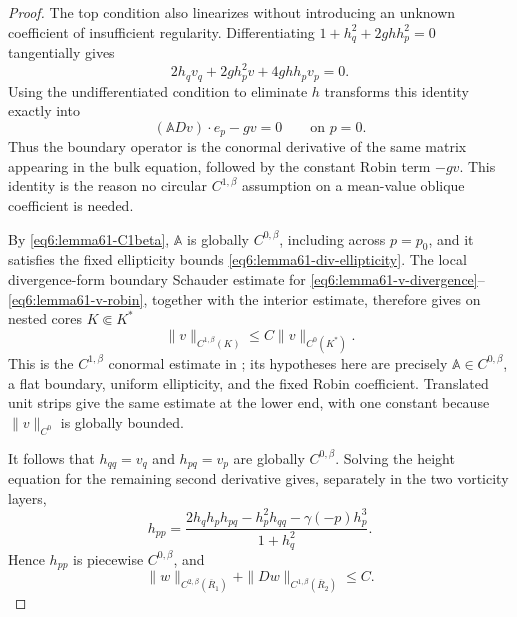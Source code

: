 \documentclass[11pt,reqno]{amsart}
\numberwithin{equation}{section}
\theoremstyle{definition}
\theoremstyle{remark}
\begin{document}
\begin{proof}
The top condition also linearizes without introducing an unknown
coefficient of insufficient regularity.  Differentiating
$1+h_q^2+2ghh_p^2=0$ tangentially gives
\[
 2h_qv_q+2gh_p^2v+4ghh_pv_p=0.
\]
Using the undifferentiated condition to eliminate $h$ transforms
this identity exactly into
\begin{equation}\label{eq6:lemma61-v-robin}
 (\mathbb A Dv)\mathbin{\cdot}e_p-gv=0
 \qquad\text{on }p=0.
\end{equation}
Thus the boundary operator is the conormal derivative of the same
matrix appearing in the bulk equation, followed by the constant
Robin term $-gv$.  This identity is the reason no circular
$C^{1,\beta}$ assumption on a mean-value oblique coefficient is
needed.

By \eqref{eq6:lemma61-C1beta}, $\mathbb A$ is globally
$C^{0,\beta}$, including across $p=p_0$, and it satisfies the fixed
ellipticity bounds \eqref{eq6:lemma61-div-ellipticity}.  The local
divergence-form boundary Schauder estimate for
\eqref{eq6:lemma61-v-divergence}--
\eqref{eq6:lemma61-v-robin}, together with the interior estimate,
therefore gives on nested cores $K\Subset K^*$
\begin{equation}\label{eq6:lemma61-v-C1beta-estimate}
 \|v\|_{C^{1,\beta}(K)}
 \le C\|v\|_{C^0(K^*)}.
\end{equation}
This is the $C^{1,\beta}$ conormal estimate in
\cite[Section 16]{Lady}; its hypotheses here are precisely
$\mathbb A\in C^{0,\beta}$, a flat boundary, uniform ellipticity,
and the fixed Robin coefficient.  Translated unit strips give the
same estimate at the lower end, with one constant because
$\|v\|_{C^0}$ is globally bounded.

It follows that $h_{qq}=v_q$ and $h_{pq}=v_p$ are globally
$C^{0,\beta}$.  Solving the height equation for the remaining
second derivative gives, separately in the two vorticity layers,
\begin{equation}\label{eq6:lemma61-hpp-algebraic}
 h_{pp}=
 \frac{2h_qh_ph_{pq}-h_p^2h_{qq}-\gamma(-p)h_p^3}
 {1+h_q^2}.
\end{equation}
Hence $h_{pp}$ is piecewise $C^{0,\beta}$, and
\begin{equation}\label{eq6:lemma61-C2beta}
 \|w\|_{C^{2,\beta}(\overline R_1)}
 +\|Dw\|_{C^{1,\beta}(\overline R_2)}\le C.
\end{equation}


\end{proof}
\end{document}
